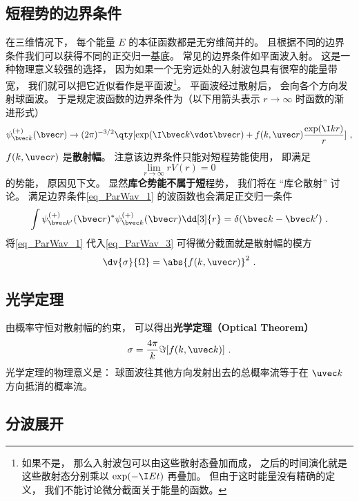 \subsection{短程势的边界条件}
在三维情况下， 每个能量 $E$ 的本征函数都是无穷维简并的。 且根据不同的边界条件我们可以获得不同的正交归一基底。 常见的边界条件如平面波入射。 这是一种物理意义较强的选择， 因为如果一个无穷远处的入射波包具有很窄的能量带宽， 我们就可以把它近似看作是平面波\footnote{如果不是， 那么入射波包可以由这些散射态叠加而成， 之后的时间演化就是这些散射态分别乘以 $\exp(-\I E t)$ 再叠加。 但由于这时能量没有精确的定义， 我们不能讨论微分截面关于能量的函数。}。 平面波经过散射后， 会向各个方向发射球面波。 于是规定波函数的边界条件为（以下用箭头表示 $r\to\infty$ 时函数的渐进形式）
\begin{equation}\label{eq_ParWav_1}
\psi_{\bvec k}^{(+)}(\bvec r) \rightarrow (2\pi)^{-3/2} \qty[\exp(\I \bvec k \vdot \bvec r) + f(k, \uvec r) \frac{\exp(\I k r)}{r}]~,
\end{equation}
$f(k, \uvec r)$ 是\textbf{散射幅}。 注意该边界条件只能对短程势能使用， 即满足
\begin{equation}
\lim_{r\to\infty} r V(r) = 0~
\end{equation}
的势能， 原因见下文。 显然\textbf{库仑势能不属于短}程势， 我们将在 “库仑散射” 讨论。 满足边界条件\autoref{eq_ParWav_1} 的波函数也会满足正交归一条件
\begin{equation}
\int \psi_{\bvec k'}^{(+)}(\bvec r)^* \psi_{\bvec k}^{(+)}(\bvec r) \dd[3]{r} = \delta(\bvec k - \bvec k')~.
\end{equation}
将\autoref{eq_ParWav_1} 代入\autoref{eq_ParWav_3} 可得微分截面就是散射幅的模方
\begin{equation}
\dv{\sigma}{\Omega} = \abs{f(k, \uvec r)}^2~.
\end{equation}

\subsection{光学定理}
由概率守恒对散射幅的约束， 可以得出\textbf{光学定理（Optical Theorem）}
\begin{equation}
\sigma = \frac{4\pi}{k} \Im[f(k, \uvec k)]~.
\end{equation}
光学定理的物理意义是： 球面波往其他方向发射出去的总概率流等于在 $\uvec k$ 方向抵消的概率流。

\subsection{分波展开}


